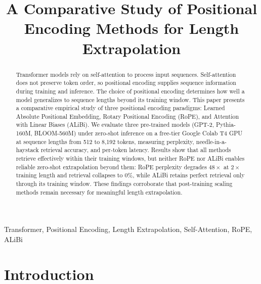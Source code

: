 \documentclass[conference]{IEEEtran}
\begin{document}
\title{A Comparative Study of Positional Encoding Methods for Length Extrapolation}

\author{
}

\maketitle

\begin{abstract}
Transformer models rely on self-attention to process input sequences. Self-attention does not preserve token order, so positional encoding supplies sequence information during training and inference. The choice of positional encoding determines how well a model generalizes to sequence lengths beyond its training window. This paper presents a comparative empirical study of three positional encoding paradigms: Learned Absolute Positional Embedding, Rotary Positional Encoding (RoPE), and Attention with Linear Biases (ALiBi). We evaluate three pre-trained models (GPT-2, Pythia-160M, BLOOM-560M) under zero-shot inference on a free-tier Google Colab T4 GPU at sequence lengths from 512 to 8,192 tokens, measuring perplexity, needle-in-a-haystack retrieval accuracy, and per-token latency. Results show that all methods retrieve effectively within their training windows, but neither RoPE nor ALiBi enables reliable zero-shot extrapolation beyond them: RoPE perplexity degrades $48\times$ at $2\times$ training length and retrieval collapses to 0\%, while ALiBi retains perfect retrieval only through its training window. These findings corroborate that post-training scaling methods remain necessary for meaningful length extrapolation.
\end{abstract}

\begin{IEEEkeywords}
Transformer, Positional Encoding, Length Extrapolation, Self-Attention, RoPE, ALiBi
\end{IEEEkeywords}

\section{Introduction}
\label{sec:introduction}
\end{document}
